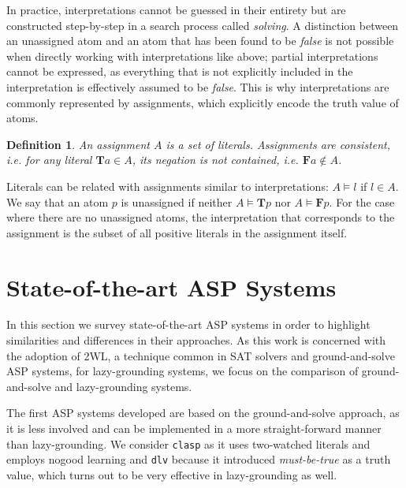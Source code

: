 \documentclass{vutinfth} %
\newtheorem{definition}{Definition}[chapter]
\newcommand{\mbt}{must-be-true\xspace}
\newcommand{\ass}{A}
\newcommand{\bT}{\mathbf{T}}
\newcommand{\bF}{\mathbf{F}}
\newcommand{\clasp}{\texttt{clasp}\xspace}
\newcommand{\dlv}{\texttt{dlv}\xspace}
\begin{document}
In practice, interpretations cannot be guessed in their entirety but are constructed step-by-step in a search process called \emph{solving}. A distinction between an unassigned atom and an atom that has been found to be \emph{false} is not possible when directly working with interpretations like above; partial interpretations cannot be expressed, as everything that is not explicitly included in the interpretation is effectively assumed to be \emph{false}. This is why interpretations are commonly represented by assignments, which explicitly encode the truth value of atoms.

\begin{definition}
An \emph{assignment} $\ass$ is a set of literals. Assignments are consistent, i.e. for any literal $\bT a \in \ass$, its negation is not contained, i.e. $\bF a \not \in \ass$.
\end{definition}

Literals can be related with assignments similar to interpretations: $A \models l$ if $l \in A$. We say that an atom $p$ is unassigned if neither $A \models \bT p$ nor $A \models \bF p$. For the case where there are no unassigned atoms, the interpretation that corresponds to the assignment is the subset of all positive literals in the assignment itself.


\section{State-of-the-art ASP Systems}

In this section we survey state-of-the-art ASP systems in order to highlight similarities and differences in their approaches. As this work is concerned with the adoption of 2WL, a technique common in SAT solvers and ground-and-solve ASP systems, for lazy-grounding systems, we focus on the comparison of ground-and-solve and lazy-grounding systems.

The first ASP systems developed are based on the ground-and-solve approach, as it is less involved and can be implemented in a more straight-forward manner than lazy-grounding. We consider \clasp as it uses two-watched literals and employs nogood learning and \dlv because it introduced \emph{\mbt} as a truth value, which turns out to be very effective in lazy-grounding as well.
\end{document}
